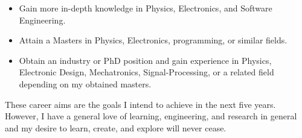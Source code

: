 \documentclass[10pt,a4paper,ragged2e,withhyper]{altacv}
\begin{document}


  

\makecvheader





\begin{itemize}
\item Gain more in-depth knowledge in Physics, Electronics, and Software Engineering.
\item Attain a Masters in Physics, Electronics, programming, or similar fields.
\item Obtain an industry or PhD position and gain experience in Physics, Electronic Design, Mechatronics, Signal-Processing, or a related field depending on my obtained masters.
\end{itemize}

 \vspace{2mm}
These career aims are the goals I intend to achieve in the next five years. However, I have a general love of learning, engineering, and research in general and my desire to learn, create, and explore will never cease.
\end{document}
